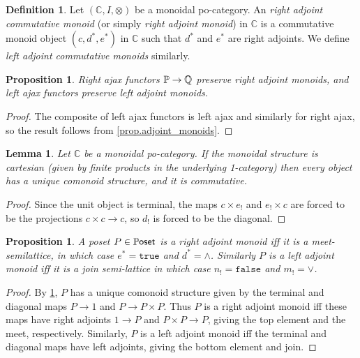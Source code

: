 \documentclass[11pt, oneside, article]{memoir}
\theoremstyle{plain}
\newtheorem{proposition}[theorem]{Proposition}
\newtheorem{lemma}[theorem]{Lemma}
\theoremstyle{definition}
\newtheorem{definition}[theorem]{Definition}
\theoremstyle{remark}
\newcommand{\const}[1]{\mathtt{#1}}%
\newcommand{\Cat}[1]{{\mathsf{#1}}}%
\newcommand{\CCat}[1]{\mathbb{\StrLeft{#1}{1}}\Cat{\StrGobbleLeft{#1}{1}}}%
\newcommand{\cc}{\mathbb{C}}
\newcommand{\lsh}[1]{#1_!}
\newcommand{\ust}[1]{#1^\ast}
\newcommand{\pposet}{\CCat{Poset}}
\newcommand{\true}{\const{true}}
\newcommand{\false}{\const{false}}
\begin{document}
\begin{definition}
Let $(\cc,I,\otimes)$ be a monoidal po-category. An \emph{right adjoint commutative monoid} (or simply \emph{right adjoint monoid}) in $\cc$ is a commutative monoid object $(c,\ust{d},\ust{e})$ in $\cc$ such that $\ust{d}$ and $\ust{e}$ are right adjoints. We define \emph{left adjoint commutative monoids} similarly.
\end{definition}

\begin{proposition}\label{prop.ajax_pres_adjmon}
Right ajax functors $\CCat{P}\to\CCat{Q}$ preserve right adjoint monoids, and left ajax functors preserve left adjoint monoids.
\end{proposition}
\begin{proof}
The composite of left ajax functors is left ajax and similarly for right ajax, so the result follows from \cref{prop.adjoint_monoids}.
\end{proof}

\begin{lemma}\label{lemma.comonoids_unique}
Let $\cc$ be a monoidal po-category. If the monoidal structure is cartesian (given by finite products in the underlying 1-category) then every object has a unique comonoid structure, and it is commutative.
\end{lemma}
\begin{proof}
Since the unit object is terminal, the maps $c\times\lsh{e}$ and $\lsh{e}\times c$ are forced to be the projections $c\times c\to c$, so $\lsh{d}$ is forced to be the diagonal. 
\end{proof}

\begin{proposition}\label{prop.adjmon_msl}
A poset $P\in\pposet$ is a right adjoint monoid iff it is a meet-semilattice, in which case $\ust{e}=\true$ and $\ust{d}=\wedge$. Similarly $P$ is a left adjoint monoid iff it is a join semi-lattice in which case $\lsh{n}=\false$ and $\lsh{m}=\vee$.
\end{proposition}
\begin{proof}
By \cref{lemma.comonoids_unique}, $P$ has a unique comonoid structure given by the terminal and diagonal maps $P\to 1$ and $P\to P\times P$. Thus $P$ is a right adjoint monoid iff these maps have right adjoints $1\to P$ and $P\times P\to P$, giving the top element and the meet, respectively. Similarly, $P$ is a left adjoint monoid iff the terminal and diagonal maps have left adjoints, giving the bottom element and join.
\end{proof}
\end{document}
